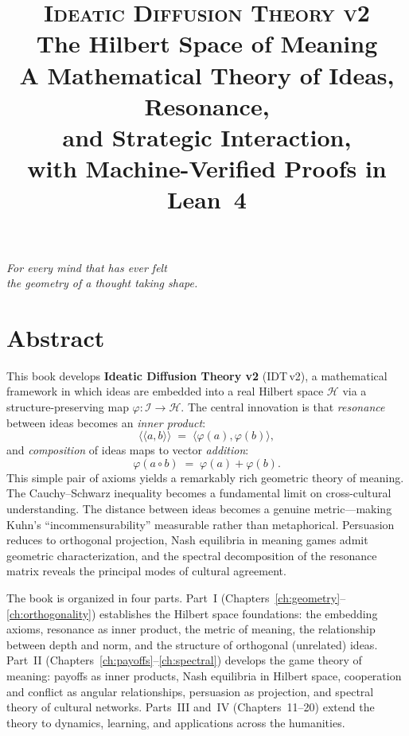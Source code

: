 \documentclass[11pt,openany]{book}
\title{%
  \vspace{-2cm}
  {\LARGE\scshape Ideatic Diffusion Theory v2}\\[0.5cm]
  {\Large The Hilbert Space of Meaning}\\[1cm]
  {\large A Mathematical Theory of Ideas, Resonance,\\
  and Strategic Interaction,\\[0.3cm]
  with Machine-Verified Proofs in Lean~4}
}
\author{}
\date{}
\theoremstyle{definition}
\theoremstyle{plain}
\theoremstyle{remark}
\newcommand{\IS}{\mathcal{I}}               %
\newcommand{\compose}{\circ}                 %
\newcommand{\Hspace}{\mathcal{H}}            %
\newcommand{\embed}[1]{\varphi(#1)}          %
\newcommand{\rs}[2]{\langle\!\langle #1, #2 \rangle\!\rangle}  %
\newcommand{\ip}[2]{\langle #1, #2 \rangle}  %
\begin{document}
\frontmatter

\maketitle
\thispagestyle{empty}

\vfill
\begin{center}
\textit{For every mind that has ever felt\\
the geometry of a thought taking shape.}
\end{center}
\vfill

\clearpage

\chapter*{Abstract}

This book develops \textbf{Ideatic Diffusion Theory v2} (IDT\,v2), a mathematical
framework in which ideas are embedded into a real Hilbert space $\Hspace$ via
a structure-preserving map $\varphi : \IS \to \Hspace$. The central innovation
is that \emph{resonance} between ideas becomes an \emph{inner product}:
\[
  \rs{a}{b} \;=\; \ip{\embed{a}}{\embed{b}},
\]
and \emph{composition} of ideas maps to vector \emph{addition}:
\[
  \embed{a \compose b} \;=\; \embed{a} + \embed{b}.
\]
This simple pair of axioms yields a remarkably rich geometric theory of meaning.
The Cauchy--Schwarz inequality becomes a fundamental limit on cross-cultural
understanding. The distance between ideas becomes a genuine metric---making
Kuhn's ``incommensurability'' measurable rather than metaphorical. Persuasion
reduces to orthogonal projection, Nash equilibria in meaning games admit
geometric characterization, and the spectral decomposition of the resonance
matrix reveals the principal modes of cultural agreement.

The book is organized in four parts. Part~I (Chapters~\ref{ch:geometry}--\ref{ch:orthogonality})
establishes the Hilbert space foundations: the embedding axioms, resonance as
inner product, the metric of meaning, the relationship between depth and norm,
and the structure of orthogonal (unrelated) ideas. Part~II
(Chapters~\ref{ch:payoffs}--\ref{ch:spectral}) develops the game theory of
meaning: payoffs as inner products, Nash equilibria in Hilbert space,
cooperation and conflict as angular relationships, persuasion as projection,
and spectral theory of cultural networks. Parts~III and~IV (Chapters~11--20)
extend the theory to dynamics, learning, and applications across the humanities.
\end{document}
